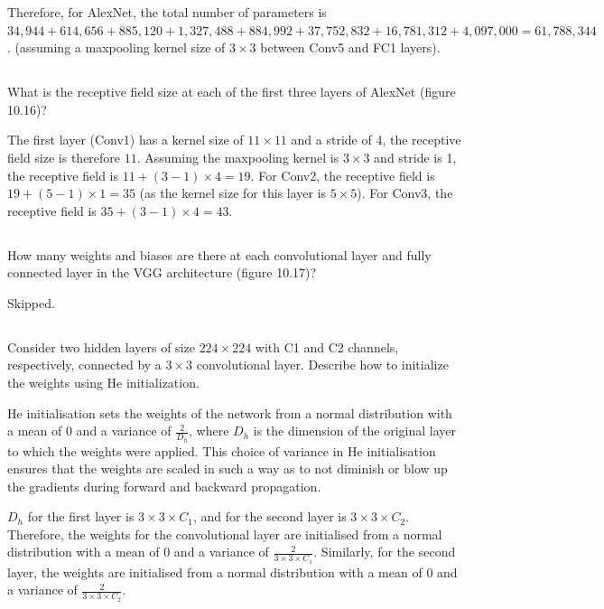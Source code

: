 \documentclass[12pt]{report}
\begin{document}
Therefore, for AlexNet, the total number of parameters is $34,944 + 614,656 + 885,120 + 1,327,488 + 884,992 + 37,752,832 + 16,781,312 + 4,097,000 = 61,788,344$. (assuming a maxpooling kernel size of $3\times3$ between Conv5 and FC1 layers).

\subsection{}
\begin{mdframed}
    What is the receptive field size at each of the first three layers of AlexNet (figure 10.16)?
\end{mdframed}

The first layer (Conv1) has a kernel size of $11\times11$ and a stride of $4$, the receptive field size is therefore $11$. Assuming the maxpooling kernel is $3\times3$ and stride is 1, the receptive field is $11 + (3-1) \times 4 = 19$. For Conv2, the receptive field is $19 + (5-1) \times 1 = 35$ (as the kernel size for this layer is $5\times5$). For Conv3, the receptive field is $35 + (3-1) \times 4 = 43$.

\subsection{}
\begin{mdframed}
    How many weights and biases are there at each convolutional layer and fully connected layer in the VGG architecture (figure 10.17)?
\end{mdframed}

Skipped.

\subsection{}
\begin{mdframed}
    Consider two hidden layers of size $224\times224$ with C1 and C2 channels, respectively, connected by a $3\times3$ convolutional layer. Describe how to initialize the weights using He initialization.
\end{mdframed}

He initialisation sets the weights of the network from a normal distribution with a mean of 0 and a variance of $\frac{2}{D_{h}}$, where $D_{h}$ is the dimension of the original layer to which the weights were applied. This choice of variance in He initialisation ensures that the weights are scaled in such a way as to not diminish or blow up the gradients during forward and backward propagation.

$D_{h}$ for the first layer is $3\times3\times C_{1}$, and for the second layer is $3\times3\times C_{2}$. Therefore, the weights for the convolutional layer are initialised from a normal distribution with a mean of 0 and a variance of $\frac{2}{3\times3\times C_{1}}$. Similarly, for the second layer, the weights are initialised from a normal distribution with a mean of 0 and a variance of $\frac{2}{3\times3\times C_{2}}$.
\end{document}
